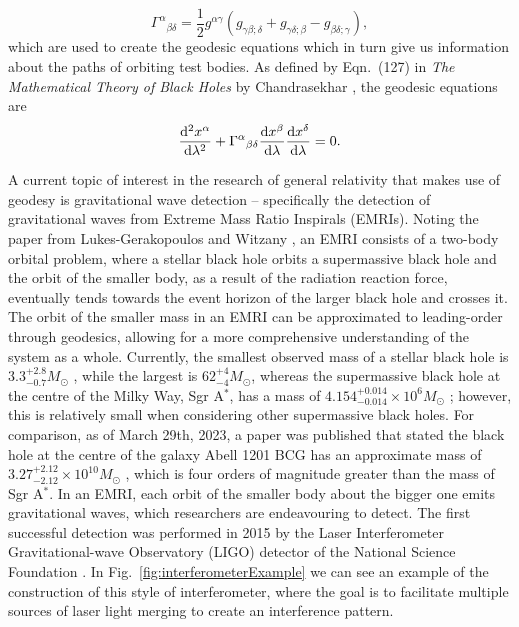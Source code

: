 \begin{equation}\label{eqn:christoffel}
\Gamma^\alpha{}_{\beta\delta}=\frac{1}{2}g^{\alpha \gamma}(g_{\gamma\beta;\delta}+g_{\gamma\delta;\beta}-g_{\beta\delta;\gamma}),
\end{equation}
which are used to create the geodesic equations which in turn give us information about the paths of orbiting test bodies.
As defined by Eqn.~(127) in \textit{The Mathematical Theory of Black Holes} by Chandrasekhar \cite{chandraBook}, the geodesic equations are
\begin{equation}\label{eqn:geodesic_eqn}
    \dv[2]{x^\alpha}{\lambda}+\Gamma^{\alpha}{}_{\beta\delta}\dv{x^\beta}{\lambda}\dv{x^\delta}{\lambda}=0.
\end{equation}

A current topic of interest in the research of general relativity that makes use of geodesy is gravitational wave detection -- specifically the detection of gravitational waves from Extreme Mass Ratio Inspirals (EMRIs).
Noting the paper from Lukes-Gerakopoulos and Witzany \cite{emriExplained}, an EMRI consists of a two-body orbital problem, where a stellar black hole orbits a supermassive black hole and the orbit of the smaller body, as a result of the radiation reaction force, eventually tends towards the event horizon of the larger black hole and crosses it.
The orbit of the smaller mass in an EMRI can be approximated to leading-order through geodesics, allowing for a more comprehensive understanding of the system as a whole.
Currently, the smallest observed mass of a stellar black hole is $3.3^{+2.8}_{-0.7}M_{\odot}$ \cite{smallStellar}, while the largest is $62^{+4}_{-4}M_{\odot}$, whereas the supermassive black hole at the centre of the Milky Way, Sgr A$^*$, has a mass of $4.154^{+0.014}_{-0.014}\times 10^6 M_{\odot}$ \cite{SgrAMass}; however, this is relatively small when considering other supermassive black holes.
For comparison, as of March 29th, 2023, a paper was published that stated the black hole at the centre of the galaxy Abell 1201 BCG has an approximate mass of $3.27^{+2.12}_{-2.12}\times 10^{10} M_{\odot}$ \cite{abellSMBH}, which is four orders of magnitude greater than the mass of Sgr A$^*$.
In an EMRI, each orbit of the smaller body about the bigger one emits gravitational waves, which researchers are endeavouring to detect.
The first successful detection was performed in 2015 by the Laser Interferometer Gravitational-wave Observatory (LIGO) detector of the National Science Foundation \cite{gravWaveDetectPaper}.
In Fig.~\eqref{fig:interferometerExample} we can see an example of the construction of this style of interferometer, where the goal is to facilitate multiple sources of laser light merging to create an interference pattern.
